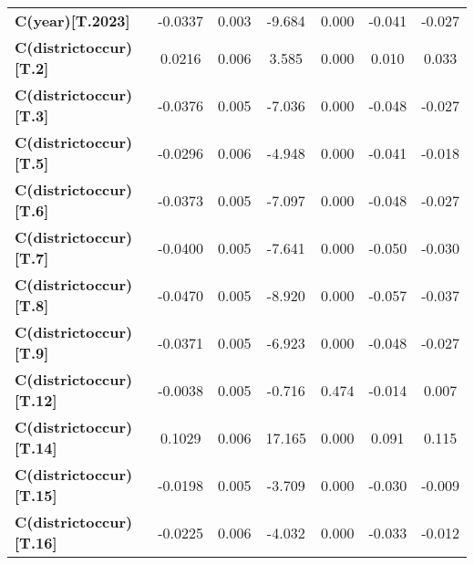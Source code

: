 \begin{center}
\begin{tabular}{lcccccc}
\textbf{C(year)[T.2023]}                                                          &      -0.0337  &        0.003     &    -9.684  &         0.000        &       -0.041    &       -0.027     \\
\textbf{C(districtoccur)[T.2]}                                                    &       0.0216  &        0.006     &     3.585  &         0.000        &        0.010    &        0.033     \\
\textbf{C(districtoccur)[T.3]}                                                    &      -0.0376  &        0.005     &    -7.036  &         0.000        &       -0.048    &       -0.027     \\
\textbf{C(districtoccur)[T.5]}                                                    &      -0.0296  &        0.006     &    -4.948  &         0.000        &       -0.041    &       -0.018     \\
\textbf{C(districtoccur)[T.6]}                                                    &      -0.0373  &        0.005     &    -7.097  &         0.000        &       -0.048    &       -0.027     \\
\textbf{C(districtoccur)[T.7]}                                                    &      -0.0400  &        0.005     &    -7.641  &         0.000        &       -0.050    &       -0.030     \\
\textbf{C(districtoccur)[T.8]}                                                    &      -0.0470  &        0.005     &    -8.920  &         0.000        &       -0.057    &       -0.037     \\
\textbf{C(districtoccur)[T.9]}                                                    &      -0.0371  &        0.005     &    -6.923  &         0.000        &       -0.048    &       -0.027     \\
\textbf{C(districtoccur)[T.12]}                                                   &      -0.0038  &        0.005     &    -0.716  &         0.474        &       -0.014    &        0.007     \\
\textbf{C(districtoccur)[T.14]}                                                   &       0.1029  &        0.006     &    17.165  &         0.000        &        0.091    &        0.115     \\
\textbf{C(districtoccur)[T.15]}                                                   &      -0.0198  &        0.005     &    -3.709  &         0.000        &       -0.030    &       -0.009     \\
\textbf{C(districtoccur)[T.16]}                                                   &      -0.0225  &        0.006     &    -4.032  &         0.000        &       -0.033    &       -0.012     \\

\end{tabular}
\end{center}
